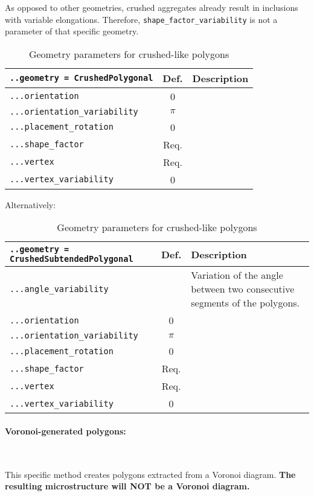 \documentclass[10pt]{article}
\newcommand{\whiteline}{\textcolor{white}{.\\}}
\begin{document}
As opposed to other geometries, crushed aggregates already result in inclusions with variable elongations.
Therefore, \verb+shape_factor_variability+ is not a parameter of that specific geometry.

\begin{table}[h!]
\begin{tabularx}{\textwidth}{lcX}
\verb+..geometry = CrushedPolygonal+ & Def. & Description\\
\hline
\verb+...orientation+ & 0 & \\
\verb+...orientation_variability+ & $\pi$ & \\
\verb+...placement_rotation+ & 0 & \\
\verb+...shape_factor+ &  Req. & \\
\verb+...vertex+ &  Req. & \\
\verb+...vertex_variability+ & 0 & \\
\hline
\end{tabularx}
\caption{Geometry parameters for crushed-like polygons}
\end{table}

Alternatively:

\begin{table}[h!]
\begin{tabularx}{\textwidth}{lcX}
\verb+..geometry = CrushedSubtendedPolygonal+ & Def. & Description\\
\hline
\verb+...angle_variability+ & & Variation of the angle between two consecutive segments of the polygons.\\
\verb+...orientation+ & 0 & \\
\verb+...orientation_variability+ & $\pi$ & \\
\verb+...placement_rotation+ & 0 & \\
\verb+...shape_factor+ &  Req. & \\
\verb+...vertex+ &  Req. & \\
\verb+...vertex_variability+ & 0 & \\
\hline
\end{tabularx}
\caption{Geometry parameters for crushed-like polygons}
\end{table}

\paragraph{Voronoi-generated polygons:} \whiteline

This specific method creates polygons extracted from a Voronoi diagram.
\textbf{The resulting microstructure will NOT be a Voronoi diagram.}
\end{document}
